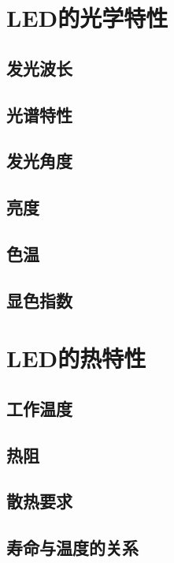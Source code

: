 \documentclass[12pt,UTF8]{ctexbook}
\begin{document}
\section{LED的光学特性}

\subsection{发光波长}

\subsection{光谱特性}

\subsection{发光角度}

\subsection{亮度}

\subsection{色温}

\subsection{显色指数}

\section{LED的热特性}

\subsection{工作温度}

\subsection{热阻}

\subsection{散热要求}

\subsection{寿命与温度的关系}
\end{document}
